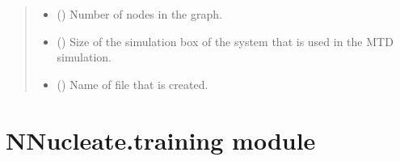 \documentclass[a4paper,10pt,english]{report}
\begin{document}
\begin{fulllineitems}
\begin{quote}
\begin{description}
\begin{itemize}
\item {} 
\sphinxAtStartPar
{} () \textendash{} Number of nodes in the graph.

\item {} 
\sphinxAtStartPar
{} () \textendash{} Size of the simulation box of the system that is used in the MTD simulation.

\item {} 
\sphinxAtStartPar
{} () \textendash{} Name of file that is created.

\end{itemize}

\end{description}\end{quote}

\end{fulllineitems}



\chapter{NNucleate.training module}
\label{\detokenize{NNucleate:module-NNucleate.training}}\label{\detokenize{NNucleate:nnucleate-training-module}}
\end{document}
